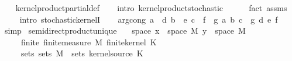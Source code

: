 \begin{isabellebody}
%
\isadelimproof
\ \ %
\endisadelimproof
%
\isatagproof
{}\isamarkupfalse%
\ kernel{\isacharunderscore}{\kern0pt}product{\isacharunderscore}{\kern0pt}partial{\isacharunderscore}{\kern0pt}def\isanewline
\ \ \isamarkupfalse%
\ {\isacharparenleft}{\kern0pt}intro\ kernel{\isacharunderscore}{\kern0pt}product{\isacharunderscore}{\kern0pt}stochastic{\isacharparenright}{\kern0pt}\isanewline
\ \ \ \ \isamarkupfalse%
\ {\isacharparenleft}{\kern0pt}fact\ assms{\isacharparenleft}{\kern0pt}{}{\isacharparenright}{\kern0pt}{\isacharparenright}{\kern0pt}\isanewline
\ \ \ \isamarkupfalse%
\ {\isacharparenleft}{\kern0pt}intro\ stochastic{\isacharunderscore}{\kern0pt}kernelI{\isacharparenright}{\kern0pt}\isanewline
\ \ \isamarkupfalse%
%
\endisatagproof
{\isafoldproof}%
%
\isadelimproof
%
\endisadelimproof
%
\isadelimdocument
%
\endisadelimdocument
%
\isatagdocument
%
\isamarkuptrue%
%
\endisatagdocument
{\isafolddocument}%
%
\isadelimdocument
%
\endisadelimdocument
{}\isamarkupfalse%
\ arg{\isacharunderscore}{\kern0pt}cong{}{\isacharcolon}{\kern0pt}\ {\isachardoublequoteopen}{\isasymlbrakk}a\ {\isacharequal}{\kern0pt}\ d{\isacharsemicolon}{\kern0pt}\ b\ {\isacharequal}{\kern0pt}\ e{\isacharsemicolon}{\kern0pt}\ c\ {\isacharequal}{\kern0pt}\ f{\isasymrbrakk}\ {\isasymLongrightarrow}\ g\ a\ b\ c\ {\isacharequal}{\kern0pt}\ g\ d\ e\ f{\isachardoublequoteclose}\isanewline
%
\isadelimproof
\ \ %
\endisadelimproof
%
\isatagproof
{}\isamarkupfalse%
\ simp%
\endisatagproof
{\isafoldproof}%
%
\isadelimproof
\isanewline
%
\endisadelimproof
\isanewline
{}\isamarkupfalse%
\ semidirect{\isacharunderscore}{\kern0pt}product{\isacharunderscore}{\kern0pt}unique{\isacharcolon}{\kern0pt}\isanewline
\ \ \ space{\isacharcolon}{\kern0pt}\ {\isachardoublequoteopen}x\ {\isasymin}\ space\ M{\isachardoublequoteclose}\ {\isachardoublequoteopen}y\ {\isasymin}\ space\ M{\isachardoublequoteclose}\isanewline
\ \ \ \ \ finite{\isacharcolon}{\kern0pt}\ {\isachardoublequoteopen}finite{\isacharunderscore}{\kern0pt}measure\ M{\isachardoublequoteclose}\ {\isachardoublequoteopen}finite{\isacharunderscore}{\kern0pt}kernel\ K{\isachardoublequoteclose}\isanewline
\ \ \ \ \ sets{\isacharcolon}{\kern0pt}\ {\isachardoublequoteopen}sets\ M\ {\isacharequal}{\kern0pt}\ sets\ {\isacharparenleft}{\kern0pt}kernel{\isacharunderscore}{\kern0pt}source\ K{\isacharparenright}{\kern0pt}{\isachardoublequoteclose}\isanewline

\end{isabellebody}
